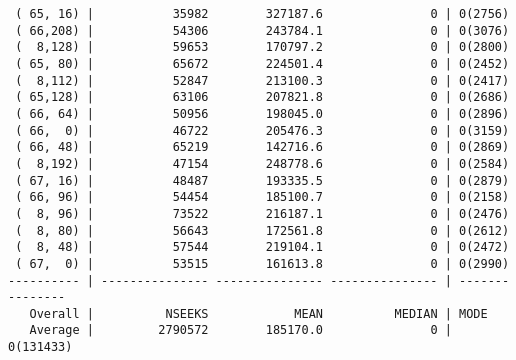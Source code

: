 \documentclass{article}
\begin{document}
\begin{verbatim}
 ( 65, 16) |           35982        327187.6               0 | 0(2756)
 ( 66,208) |           54306        243784.1               0 | 0(3076)
 (  8,128) |           59653        170797.2               0 | 0(2800)
 ( 65, 80) |           65672        224501.4               0 | 0(2452)
 (  8,112) |           52847        213100.3               0 | 0(2417)
 ( 65,128) |           63106        207821.8               0 | 0(2686)
 ( 66, 64) |           50956        198045.0               0 | 0(2896)
 ( 66,  0) |           46722        205476.3               0 | 0(3159)
 ( 66, 48) |           65219        142716.6               0 | 0(2869)
 (  8,192) |           47154        248778.6               0 | 0(2584)
 ( 67, 16) |           48487        193335.5               0 | 0(2879)
 ( 66, 96) |           54454        185100.7               0 | 0(2158)
 (  8, 96) |           73522        216187.1               0 | 0(2476)
 (  8, 80) |           56643        172561.8               0 | 0(2612)
 (  8, 48) |           57544        219104.1               0 | 0(2472)
 ( 67,  0) |           53515        161613.8               0 | 0(2990)
---------- | --------------- --------------- --------------- | ---------------
   Overall |          NSEEKS            MEAN          MEDIAN | MODE           
   Average |         2790572        185170.0               0 | 0(131433)

\end{verbatim}
\end{document}
